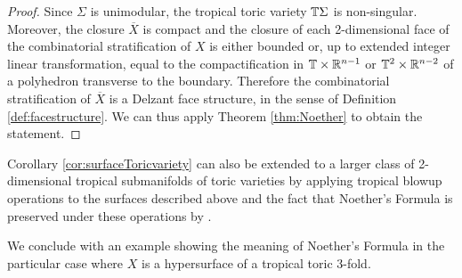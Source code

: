 \begin{proof}
Since $\Sigma$ is unimodular, the tropical toric variety  $ \mathbb{T}\Sigma$ is non-singular. Moreover, the closure $\overline{X}$ is compact and the closure of each 2-dimensional face of the combinatorial stratification of $X$ is either bounded or, up to extended  integer linear transformation, equal to the compactification in $\mathbb{T} \times \mathbb{R}^{n-1}$ or $\mathbb{T}^2 \times \mathbb{R}^{n-2}$ of a polyhedron transverse to the boundary. 
Therefore the combinatorial stratification of $\overline{X}$ is a Delzant face structure, in the sense of Definition \ref{def:facestructure}. We can thus apply Theorem \ref{thm:Noether} to obtain the statement. 
\end{proof}


Corollary \ref{cor:surfaceToricvariety} can also be extended to a larger class of 2-dimensional tropical submanifolds of toric varieties by applying tropical blowup operations to the surfaces described above and the fact that Noether's Formula is preserved under these operations by \cite[Theorem 5.1]{Shaw:Surf}.

We conclude with an example showing the meaning of Noether's Formula in the particular case where $X$ is a hypersurface of a tropical toric 3-fold.

